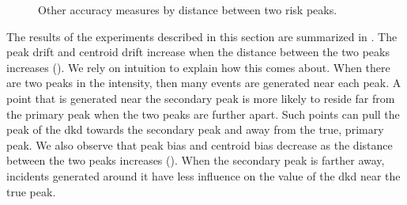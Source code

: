 \begin{figure}[htbp]
\begin{subfigure}[b]{0.49\textwidth}
        \caption{}
        \label{fig:other_measures:p1.4_100_G:centroid_drift}
    \end{subfigure}
    \caption[Other accuracy measures by distance between two risk peaks]
        {Other accuracy measures by distance between two risk peaks. \errorplotcaption}
    \label{fig:other_measures:p1.4_100_G}
\end{figure}

The results of the experiments described in this section are summarized in .
The \gls{peak drift} and \gls{centroid drift} increase when the distance between the two peaks increases ().
We rely on intuition to explain how this comes about.
When there are two peaks in the intensity,
then many events are generated near each peak.
A point that is generated near the secondary peak is more likely to reside far from the primary peak when the two peaks are further apart.
Such points can pull the peak of the \gls{dkd} towards the secondary peak and away from the true, primary peak.
We also observe that \gls{peak bias} and \gls{centroid bias} decrease as the distance between the two peaks increases ().
When the secondary peak is farther away,
incidents generated around it have less influence on the value of the \gls{dkd} near the true peak.


\setpath{}
